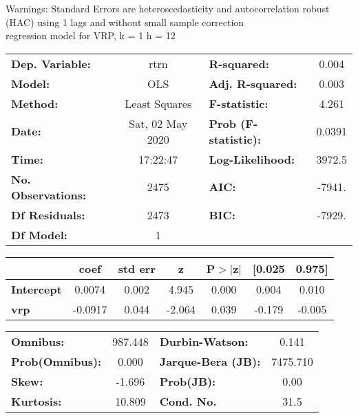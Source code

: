 Warnings: \newline
 [1] Standard Errors are heteroscedasticity and autocorrelation robust (HAC) using 1 lags and without small sample correction\\ 

regression model for VRP, k = 1 h = 12\begin{center}
\begin{tabular}{lclc}
\toprule
\textbf{Dep. Variable:}    &       rtrn       & \textbf{  R-squared:         } &     0.004   \\
\textbf{Model:}            &       OLS        & \textbf{  Adj. R-squared:    } &     0.003   \\
\textbf{Method:}           &  Least Squares   & \textbf{  F-statistic:       } &     4.261   \\
\textbf{Date:}             & Sat, 02 May 2020 & \textbf{  Prob (F-statistic):} &   0.0391    \\
\textbf{Time:}             &     17:22:47     & \textbf{  Log-Likelihood:    } &    3972.5   \\
\textbf{No. Observations:} &        2475      & \textbf{  AIC:               } &    -7941.   \\
\textbf{Df Residuals:}     &        2473      & \textbf{  BIC:               } &    -7929.   \\
\textbf{Df Model:}         &           1      & \textbf{                     } &             \\
\bottomrule
\end{tabular}
\begin{tabular}{lcccccc}
                   & \textbf{coef} & \textbf{std err} & \textbf{z} & \textbf{P$> |$z$|$} & \textbf{[0.025} & \textbf{0.975]}  \\
\midrule
\textbf{Intercept} &       0.0074  &        0.002     &     4.945  &         0.000        &        0.004    &        0.010     \\
\textbf{vrp}       &      -0.0917  &        0.044     &    -2.064  &         0.039        &       -0.179    &       -0.005     \\
\bottomrule
\end{tabular}
\begin{tabular}{lclc}
\textbf{Omnibus:}       & 987.448 & \textbf{  Durbin-Watson:     } &    0.141  \\
\textbf{Prob(Omnibus):} &   0.000 & \textbf{  Jarque-Bera (JB):  } & 7475.710  \\
\textbf{Skew:}          &  -1.696 & \textbf{  Prob(JB):          } &     0.00  \\
\textbf{Kurtosis:}      &  10.809 & \textbf{  Cond. No.          } &     31.5  \\
\bottomrule
\end{tabular}
\end{center}


